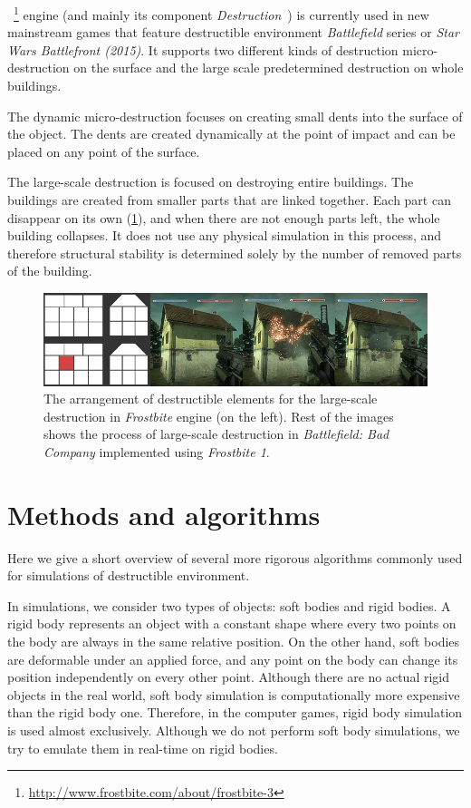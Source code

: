 ~\footnote{\url{http://www.frostbite.com/about/frostbite-3}} engine (and mainly its component \emph{Destruction}~\cite{destruction}) is currently used in new mainstream games that feature destructible environment \eg \emph{Battlefield} series or \emph{Star Wars Battlefront (2015)}. It supports two different kinds of destruction micro-destruction on the surface and the large scale predetermined destruction on whole buildings. 

The dynamic micro-destruction focuses on creating small dents into the surface of the object. The dents are created dynamically at the point of impact and can be placed on any point of the surface.

The large-scale destruction is focused on destroying entire buildings. The buildings are created from smaller parts that are linked together. Each part can disappear on its own (\cref{fig:frostbite}), and when there are not enough parts left, the whole building collapses. It does not use any physical simulation in this process, and therefore structural stability is determined solely by the number of removed parts of the building.

\begin{figure}
\centering
\includegraphics[width=\textwidth]{img/frostbite}
\caption{The arrangement of destructible elements for the large-scale destruction in \emph{Frostbite} engine (on the left). Rest of the images shows the process of large-scale destruction in \emph{Battlefield: Bad Company} implemented using \emph{Frostbite 1}.}
\label{fig:frostbite}
\end{figure}

\section{Methods and algorithms}
\label{sec:methods}
Here we give a short overview of several more rigorous algorithms commonly used for simulations of destructible environment. 

In simulations, we consider two types of objects: soft bodies and rigid bodies. A rigid body represents an object with a constant shape where every two points on the body are always in the same relative position. On the other hand, soft bodies are deformable under an applied force, and any point on the body can change its position independently on every other point. Although there are no actual rigid objects in the real world, soft body simulation is computationally more expensive than the rigid body one. Therefore, in the computer games, rigid body simulation is used almost exclusively. Although we do not perform soft body simulations, we try to emulate them in real-time on rigid bodies.


